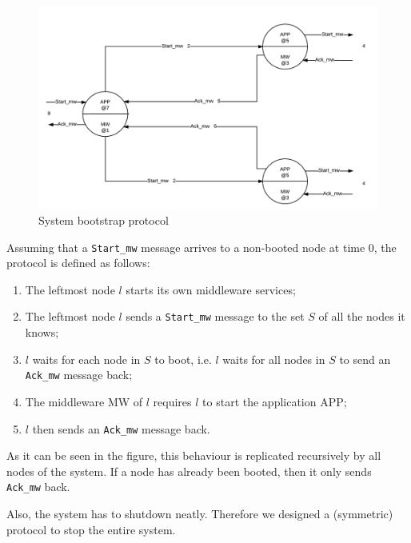 \begin{figure}[H]
  \centering
  \includegraphics[width=\columnwidth]{sections/images/solution/bootstrap.pdf}
  \caption{System bootstrap protocol}
  \label{fig:sys-bootstrap-protocol}
\end{figure}

Assuming that a \texttt{Start\_mw} message arrives to a non-booted node at time
0, the protocol is defined as follows:

\begin{enumerate}
  \item The leftmost node $l$ starts its own middleware services;
  \item The leftmost node $l$ sends a \texttt{Start\_mw} message to the set
    $S$ of all the nodes it knows;
  \item $l$ waits for each node in $S$ to boot, i.e. $l$ waits for all nodes
    in $S$ to send an \texttt{Ack\_mw} message back;
  \item The middleware MW of $l$ requires $l$ to start the application APP;
  \item $l$ then sends an \texttt{Ack\_mw} message back.
\end{enumerate}

As it can be seen in the figure, this behaviour is replicated recursively
by all nodes of the system. If a node has already been booted, then it only
sends \texttt{Ack\_mw} back.

Also, the system has to shutdown neatly. Therefore we designed a (symmetric)
protocol to stop the entire system.



